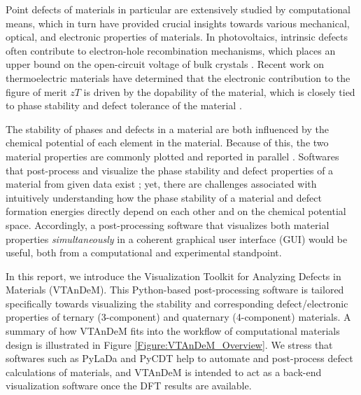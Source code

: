 \documentclass[%
 reprint,
 amsmath,amssymb,
 aps,
]{revtex4-1}
\begin{document}
Point defects of materials in particular are extensively studied by computational means, which in turn have provided crucial insights towards various mechanical, optical, and electronic properties of materials. In photovoltaics, intrinsic defects often contribute to electron-hole recombination mechanisms, which places an upper bound on the open-circuit voltage of bulk crystals \cite{2014_Zakutayev, 2017_Kim, 2017_Liu, 2018_Liu, 2019_Kim}. Recent work on thermoelectric materials have determined that the electronic contribution to the figure of merit $zT$ is driven by the dopability of the material, which is closely tied to phase stability and defect tolerance of the material \cite{2008_Snyder, 2011_Pei, 2015_Yan}.


The stability of phases and defects in a material are both influenced by the chemical potential of each element in the material. Because of this, the two material properties are commonly plotted and reported in parallel \cite{2013_Chen, 2014_Chen, 2014_Tang, 2015_Swift, 2017_Adamski, 2017_Li, 2017_Zhu, 2019_Kim, 2019_Rowberg, 2019_Xu}. Softwares that post-process and visualize the phase stability and defect properties of a material from given data exist \cite{2014_Buckeridge, 2017_Pean, 2018_Stoliaroff}; yet, there are challenges associated with intuitively understanding how the phase stability of a material and defect formation energies directly depend on each other and on the chemical potential space. Accordingly, a post-processing software that visualizes both material properties \textit{simultaneously} in a coherent graphical user interface (GUI) would be useful, both from a computational and experimental standpoint.

In this report, we introduce the Visualization Toolkit for Analyzing Defects in Materials (VTAnDeM). This Python-based post-processing software is tailored specifically towards visualizing the stability and corresponding defect/electronic properties of ternary (3-component) and quaternary (4-component) materials. A summary of how VTAnDeM fits into the workflow of computational materials design is illustrated in Figure \ref{Figure:VTAnDeM_Overview}. We stress that softwares such as PyLaDa \cite{2017_Goyal} and PyCDT \cite{2018_Broberg} help to automate and post-process defect calculations of materials, and VTAnDeM is intended to act as a back-end visualization software once the DFT results are available.
\end{document}
